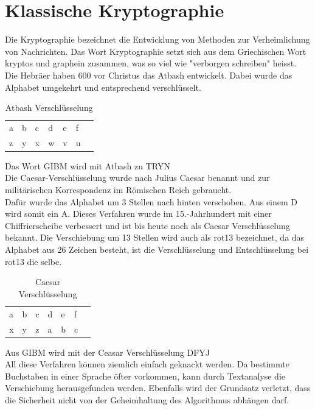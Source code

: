 \section{Klassische Kryptographie}
Die Kryptographie bezeichnet die Entwicklung von Methoden zur Verheimlichung von Nachrichten. Das Wort Kryptographie setzt sich aus dem Griechischen Wort kryptos und graphein zusammen, was so viel wie "verborgen schreiben" heisst.  \cite{kryptographie_Grundlagen} \\
Die Hebräer haben 600 vor Christus das Atbash entwickelt. Dabei wurde das Alphabet umgekehrt und entsprechend verschlüsselt. \\
%
\begin{table}[ht]
\caption{Atbash Verschlüsselung}
\begin{center}
\begin{tabular}{|l|l|l|l|l|l|l|}
  a & b & c & d & e & f\\
  z & y & x & w & v & u\\
\end{tabular}
\end{center}
\end{table}
%
Das Wort GIBM wird mit Atbash zu TRYN \\
Die Caesar-Verschlüsselung wurde nach Julius Caesar benannt und zur militärischen Korrespondenz im Römischen Reich gebraucht.\\
Dafür wurde das Alphabet um 3 Stellen nach hinten verschoben. Aus einem D wird somit ein A. Dieses Verfahren wurde im 15.-Jahrhundert mit einer Chiffrierscheibe verbessert und ist bis heute noch als Caesar Verschlüsselung bekannt. Die Verschiebung um 13 Stellen wird auch als rot13 bezeichnet, da das Alphabet aus 26 Zeichen besteht, ist die Verschlüsselung und Entschlüsselung bei rot13 die selbe. \\
%
\begin{table}[ht]
\caption{Caesar Verschlüsselung}
\begin{center}
\begin{tabular}{|l|l|l|l|l|l|l|}
  a & b & c & d & e & f\\
  x & y & z & a & b & c\\
\end{tabular}
\end{center}
\end{table}
%
Aus GIBM wird mit der Ceasar Verschlüsselung DFYJ \\
%
All diese Verfahren können ziemlich einfach geknackt werden. Da bestimmte Buchstaben in einer Sprache öfter vorkommen, kann durch Textanalyse die Verschiebung herausgefunden werden. Ebenfalls wird der Grundsatz verletzt, dass die Sicherheit nicht von der Geheimhaltung des Algorithmus abhängen darf. \cite{kerckhoffsprinzip}
%
%
